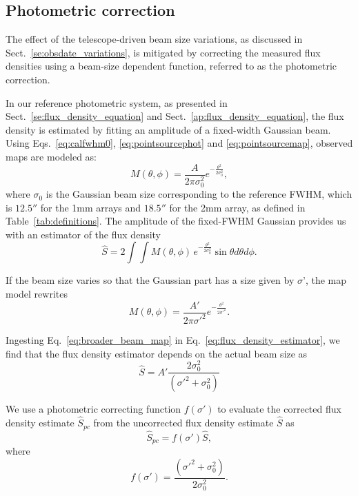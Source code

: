 \subsection{Photometric correction}
\label{se:photometric_correction}

The effect of the telescope-driven beam size variations, as discussed
in Sect.~\ref{se:obsdate_variations}, is mitigated by correcting the measured flux
densities using a beam-size dependent function, referred to as the
photometric correction.


In our reference photometric system, as presented in
Sect.~\ref{se:flux_density_equation} and
Sect.~\ref{ap:flux_density_equation},
the flux density is estimated by fitting an amplitude of a fixed-width
Gaussian beam. Using Eqs.~\ref{eq:calfwhm0}, \ref{eq:pointsourcephot}
and \ref{eq:pointsourcemap}, observed maps are modeled as:
\begin{equation}
  M(\theta, \phi) = \frac{A}{2 \pi \sigma_{0}^{2}} e^{-\frac{\theta^{2}}{2\sigma_{0}^{2}}}, 
\end{equation}
where $\sigma_{0}$ is the Gaussian beam size corresponding to the
reference FWHM, which is $12.5''$ for the 1mm arrays and $18.5''$ for
the 2mm array, as defined in Table~\ref{tab:definitions}. The
amplitude of the fixed-FWHM Gaussian provides us with an estimator of
the flux density 
\begin{equation}
  \hat{S}  = 2 \int \int M(\theta, \phi)\, e^{-\frac{\theta^{2}}{2\sigma_{0}^{2}}} \sin \theta d\theta d\phi.
  \label{eq:flux_density_estimator}
\end{equation}

If the beam size varies so that the Gaussian part has a size given by
$\sigma ’$, the map model rewrites  
\begin{equation}
  M(\theta, \phi) = \frac{A'}{2 \pi \sigma'^{2}} e^{-\frac{\theta^{2}}{2\sigma'^{2}}}.
  \label{eq:broader_beam_map}
\end{equation}

Ingesting Eq.~\ref{eq:broader_beam_map} in
Eq.~\ref{eq:flux_density_estimator}, we find that the flux density
estimator depends on the actual beam size as
\begin{equation}
  \hat{S}  = A' \frac{2 \sigma_0^2}{(\sigma'^2 + \sigma_0^2)}
\end{equation}


We use a photometric correcting function $f(\sigma')$ to evaluate the corrected flux density estimate $\hat{S}_{pc}$ from the
uncorrected flux density estimate $\hat{S}$ as
\begin{equation}
  \hat{S}_{pc} = f(\sigma')\hat{S},
\end{equation} 
where
\begin{equation}
  f(\sigma') = \frac{(\sigma'^2 + \sigma_0^2)}{2 \sigma_0^2}. 
\end{equation} 



